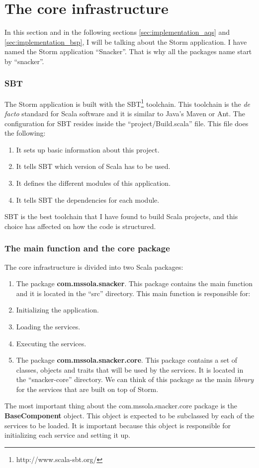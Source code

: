  
\section{The core infrastructure}
\label{sec:implementation_core}

In this section and in the following sections \ref{sec:implementation_aqs} and
\ref{sec:implementation_bsp}, I will be talking about the Storm application.
I have named the Storm application ``Snacker''. That is why all the packages
name start by ``snacker''.

\subsubsection*{SBT}

The Storm application is built with the SBT\footnote{http://www.scala-sbt.org/}
toolchain. This toolchain is the {\it de facto} standard for Scala software and
it is similar to Java's Maven or Ant. The configuration for SBT resides inside
the ``project/Build.scala'' file. This file does the following:

\begin{enumerate}
  \itemsep0em
  \item It sets up basic information about this project.
  \item It tells SBT which version of Scala has to be used.
  \item It defines the different modules of this application.
  \item It tells SBT the dependencies for each module.
\end{enumerate}

SBT is the best toolchain that I have found to build Scala projects, and this
choice has affected on how the code is structured.

\subsubsection*{The main function and the core package}

The core infrastructure is divided into two Scala packages:

\begin{enumerate}
  \itemsep0em
  \item The package {\bf com.mssola.snacker}. This package contains the main
function and it is located in the ``src'' directory. This main function is
responsible for:
    \mylist
      \item Initializing the application.
      \item Loading the services.
      \item Executing the services.
    \mylistend
  \item The package {\bf com.mssola.snacker.core}. This package contains a set
of classes, objects and traits that will be used by the services. It is
located in the ``snacker-core'' directory. We can think of this package as the
main {\it library} for the services that are built on top of Storm.
\end{enumerate}

The most important thing about the com.mssola.snacker.core package is the {\bf
BaseComponent} object. This object is expected to be subclassed by each of the
services to be loaded. It is important because this object is responsible for
initializing each service and setting it up.

